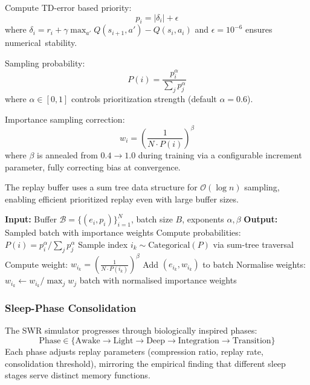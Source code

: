 \documentclass[12pt, a4paper]{article}
\begin{document}
Compute TD-error based priority:
\begin{equation}
	p_i = |\delta_i| + \epsilon
\end{equation}
where $\delta_i = r_i + \gamma \max_{a'} Q(s_{i+1}, a') - Q(s_i, a_i)$ and $\epsilon = 10^{-6}$ ensures numerical~stability.

Sampling probability:
\begin{equation}
	P(i) = \frac{p_i^\alpha}{\sum_j p_j^\alpha}
\end{equation}
where $\alpha \in [0, 1]$ controls prioritization strength (default $\alpha = 0.6$).

Importance sampling correction:
\begin{equation}
	w_i = \left(\frac{1}{N \cdot P{(i)}}\right)^\beta %
\end{equation}
where $\beta$ is annealed from $0.4 \to 1.0$ during training via a configurable increment parameter, fully correcting bias at convergence.

The replay buffer uses a sum tree data structure for $\mathcal{O}(\log n)$ sampling, enabling efficient prioritized replay even with large buffer sizes.

\begin{algorithm}[htbp]
	\caption{Prioritized Experience Sampling}
	\label{alg:sampling}
	\begin{algorithmic}[1]
		\State \textbf{Input:} Buffer $\mathcal{B} = \{(e_i, p_i)\}_{i=1}^{N}$, batch size $B$, exponents $\alpha, \beta$
		\State \textbf{Output:} Sampled batch with importance weights
		\State
		\State Compute probabilities: $P(i) = p_i^\alpha / \sum_j p_j^\alpha$
			\State Sample index $i_k \sim \text{Categorical}(P)$ via sum-tree traversal
			\State Compute weight: $w_{i_k} = \left(\frac{1}{N \cdot P(i_k)}\right)^\beta$
			\State Add $(e_{i_k}, w_{i_k})$ to batch
		\EndFor
		\State Normalise weights: $w_{i_k} \leftarrow w_{i_k} / \max_j w_j$
		\State \Return batch with normalised importance weights
	\end{algorithmic}
\end{algorithm}

\subsubsection{Sleep-Phase Consolidation}

The SWR simulator progresses through biologically inspired phases:
\begin{equation}
	\text{Phase} \in \{\text{Awake} \to \text{Light} \to \text{Deep} \to \text{Integration} \to \text{Transition}\}
\end{equation}
Each phase adjusts replay parameters (compression ratio, replay rate, consolidation threshold), mirroring the empirical finding that different sleep stages serve distinct memory functions.
\end{document}
